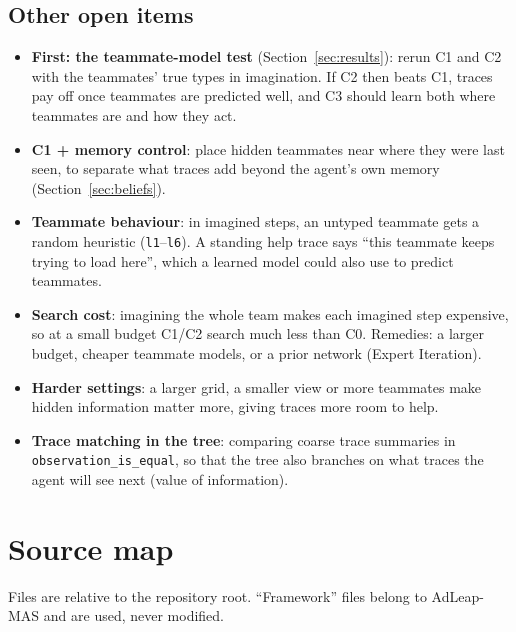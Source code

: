 \documentclass[11pt,a4paper]{article}
\newcommand{\code}[1]{\texttt{#1}}
\theoremstyle{remark}
\begin{document}
\subsection{Other open items}
\begin{itemize}[nosep]
  \item \textbf{First: the teammate-model test} (Section~\ref{sec:results}): rerun C1 and C2 with the teammates' true
        types in imagination. If C2 then beats C1, traces pay off once teammates are predicted well, and C3 should learn
        both where teammates are and how they act.
  \item \textbf{C1 + memory control}: place hidden teammates near where they were last seen, to separate what traces add
        beyond the agent's own memory (Section~\ref{sec:beliefs}).
  \item \textbf{Teammate behaviour}: in imagined steps, an untyped teammate gets a random heuristic (\code{l1}--\code{l6}).
        A standing help trace says ``this teammate keeps trying to load here'', which a learned model could also use to
        predict teammates.
  \item \textbf{Search cost}: imagining the whole team makes each imagined step expensive, so at a small budget C1/C2
        search much less than C0. Remedies: a larger budget, cheaper teammate models, or a prior network (Expert
        Iteration).
  \item \textbf{Harder settings}: a larger grid, a smaller view or more teammates make hidden information matter more,
        giving traces more room to help.
  \item \textbf{Trace matching in the tree}: comparing coarse trace summaries in \code{observation\_is\_equal}, so that
        the tree also branches on what traces the agent will see next (value of information).
\end{itemize}

\section{Source map}
\label{sec:source-map}

Files are relative to the repository root. ``Framework'' files belong to AdLeap-MAS and are used, never modified.
\end{document}

